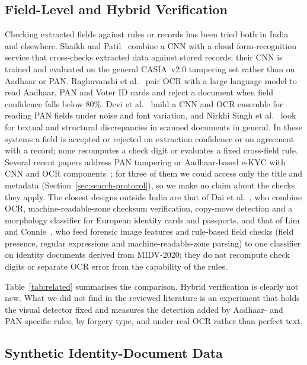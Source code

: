 \documentclass[12pt]{article}
\begin{document}
\subsection{Field-Level and Hybrid Verification}

Checking extracted fields against rules or records has been tried both
in India and elsewhere. Shaikh and Patil~\cite{shaikh} combine a CNN
with a cloud form-recognition service that cross-checks extracted data
against stored records; their CNN is trained and evaluated on the
general CASIA~v2.0 tampering set rather than on Aadhaar or PAN.
Raghuvanshi et al.~\cite{raghuvanshi} pair OCR with a large language
model to read Aadhaar, PAN and Voter ID cards and reject a document when
field confidence falls below 80\%. Devi et al.~\cite{panens} build a
CNN and OCR ensemble for reading PAN fields under noise and font
variation, and Nirkhi Singh et al.~\cite{nirkhi} look for textual and
structural discrepancies in scanned documents in general. In these
systems a field is accepted or rejected on extraction confidence or on
agreement with a record; none recomputes a check digit or evaluates a
fixed cross-field rule. Several recent papers address PAN
tampering or Aadhaar-based e-KYC with CNN and OCR
components~\cite{lalsudhesh,arora,hamza,muralikrishna}; for three of
them we could access only the title and metadata
(Section~\ref{sec:search-protocol}), so we make no claim about the
checks they apply. The closest designs outside India are that of Dai
et al.~\cite{dai}, who combine OCR, machine-readable-zone checksum
verification, copy-move detection and a morphology classifier for
European identity cards and passports, and that of Lim and
Connie~\cite{limconnie}, who feed forensic image features and
rule-based field checks (field presence, regular expressions and
machine-readable-zone parsing) to one classifier on identity documents
derived from MIDV-2020; they do not recompute check digits or separate
OCR error from the capability of the rules.

Table~\ref{tab:related}\nocite{babbar,bae,doctamper,trufor,cmid,shaikh,raghuvanshi,panens,dai,limconnie,flid} summarises the comparison. Hybrid verification
is clearly not new. What we did not find in the reviewed literature is
an experiment that holds the visual detector fixed and measures the
detection added by Aadhaar- and PAN-specific rules, by forgery type, and
under real OCR rather than perfect text.


\subsection{Synthetic Identity-Document Data}
\end{document}
